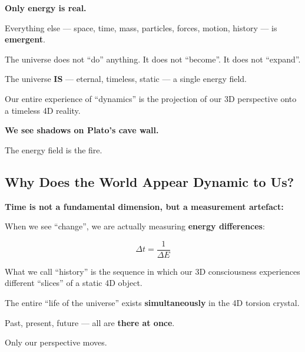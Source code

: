 	\begin{philosophical}
		\textbf{Only energy is real.}

		\vspace{0.3cm}

		Everything else — space, time, mass, particles, forces, motion, history — is \textbf{emergent}.

		\vspace{0.3cm}

		The universe does not \enquote{do} anything. It does not \enquote{become}. It does not \enquote{expand}.

		\vspace{0.3cm}

		The universe \textbf{IS} — eternal, timeless, static — a single energy field.

		\vspace{0.3cm}

		Our entire experience of \enquote{dynamics} is the projection of our 3D perspective onto a timeless 4D reality.

		\vspace{0.3cm}

		\textbf{We see shadows on Plato’s cave wall.}

		\vspace{0.3cm}

		The energy field is the fire.
	\end{philosophical}

	\subsection{Why Does the World Appear Dynamic to Us?}

	\begin{important}
		\textbf{Time is not a fundamental dimension, but a measurement artefact:}

		\vspace{0.3cm}

		When we see \enquote{change}, we are actually measuring \textbf{energy differences}:

		\begin{equation}
			\Delta t = \frac{1}{\Delta E}
		\end{equation}

		\vspace{0.3cm}

		What we call \enquote{history} is the sequence in which our 3D consciousness experiences different \enquote{slices} of a static 4D object.

		\vspace{0.3cm}

		The entire \enquote{life of the universe} exists \textbf{simultaneously} in the 4D torsion crystal.

		\vspace{0.3cm}

		Past, present, future — all are \textbf{there at once}.

		Only our perspective moves.
	\end{important}

